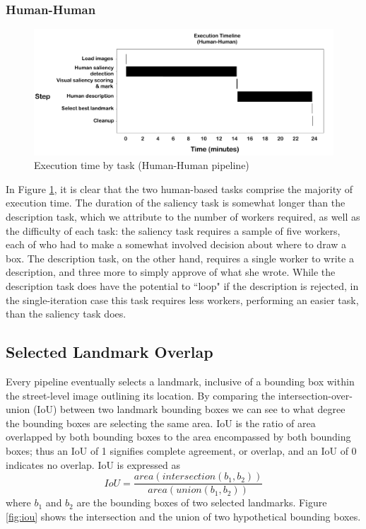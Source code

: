 \subsubsection{Human-Human}
\begin{figure}[htbp]
  \centering
  \includegraphics[width=\textwidth]{images/timeline_hh.pdf}
  \caption{Execution time by task (Human-Human pipeline)}
  \label{fig:plot:timeline:hh}
\end{figure}

In Figure \ref{fig:plot:timeline:hh}, it is clear that the two human-based tasks comprise the majority of execution time. The duration of the saliency task is somewhat longer than the description task, which we attribute to the number of workers required, as well as the difficulty of each task: the saliency task requires a sample of five workers, each of who had to make a somewhat involved decision about where to draw a box. The description task, on the other hand, requires a single worker to write a description, and three more to simply approve of what she wrote. While the description task does have the potential to ``loop" if the description is rejected, in the single-iteration case this task requires less workers, performing an easier task, than the saliency task does.

\subsection{Selected Landmark Overlap}

Every pipeline eventually selects a landmark, inclusive of a bounding box within the street-level image outlining its location. By comparing the intersection-over-union (IoU) between two landmark bounding boxes we can see to what degree the bounding boxes are selecting the same area. IoU is the ratio of area overlapped by both bounding boxes to the area encompassed by both bounding boxes; thus an IoU of 1 signifies complete agreement, or overlap, and an IoU of 0 indicates no overlap. IoU is expressed as
\begin{equation}
    IoU = \frac{area(intersection(b_1,b_2))}{area(union(b_1,b_2))}
\end{equation}
where $b_1$ and $b_2$ are the bounding boxes of two selected landmarks. Figure \ref{fig:iou} shows the intersection and the union of two hypothetical bounding boxes.

